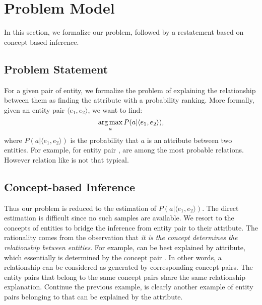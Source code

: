 
\section{Problem Model}
\label{sec:framework}

In this section, we formalize our problem, followed by a restatement based on concept based inference.

\subsection{Problem Statement}
For a given pair of entity, we formalize the problem of explaining the relationship between them as finding the attribute with a probability ranking.
More formally, given an entity pair $ \langle e_1, e_2 \rangle $, we want to find:
\begin{equation}
\operatorname*{arg\,max}_a P(a|\langle e_1,e_2 \rangle),
\end{equation}
where $P(a| \langle e_1, e_2 \rangle )$ is the probability that $a$ is an attribute between two entities.
For example, for entity pair ,  are among the most probable relations.
However relation like  is not that typical. 


\subsection{Concept-based Inference}
Thus our problem is reduced to the estimation of $P(a| \langle e_1, e_2 \rangle )$.
The direct estimation is difficult since no such samples are available.
We resort to the concepts of entities to bridge the inference from entity pair to their attribute.
The rationality comes from the observation that {\it it is the concept determines the relationship between entities}. For example,  can be best explained by  attribute, which essentially is determined by the concept pair .
In other words, a relationship can be considered as generated by corresponding concept pairs.
The entity pairs that belong to the same concept pairs share the same relationship explanation.
Continue the previous example,  is clearly another example of entity pairs belonging to  that can be explained by the  attribute.

